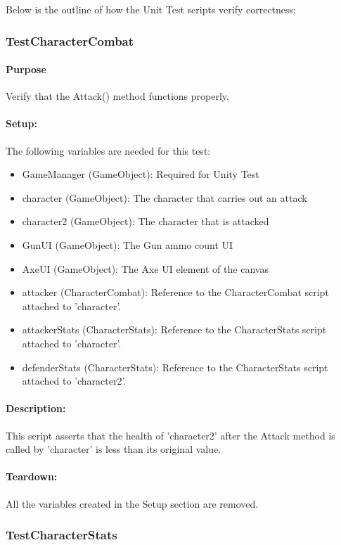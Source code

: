 \documentclass[12pt, titlepage]{article}
\begin{document}
Below is the outline of how the Unit Test scripts verify correctness: \newline

\subsubsection{Test\textunderscore CharacterCombat}

\paragraph{Purpose} Verify that the Attack() method functions properly.

\paragraph{Setup: } The following variables are needed for this test:
\begin{itemize}
	\item GameManager (GameObject): Required for Unity Test
	\item  character (GameObject): The character that carries out an attack
	\item  character2 (GameObject):
	The character that is attacked
	\item  GunUI (GameObject): The Gun ammo count UI
	\item AxeUI (GameObject): The Axe UI element of the canvas
	\item attacker (CharacterCombat): Reference to the CharacterCombat script attached to 'character'.
	\item attackerStats (CharacterStats): Reference to the CharacterStats script attached to 'character'.
	\item defenderStats (CharacterStats): Reference to the CharacterStats script attached to 'character2'.
\end{itemize}
\paragraph{Description: }
	This script asserts that the health of 'character2' after the Attack method is called by 'character' is less than its original value.
\paragraph{Teardown: } All the variables created in the Setup section are removed.
\subsubsection{Test\textunderscore CharacterStats}
\end{document}
